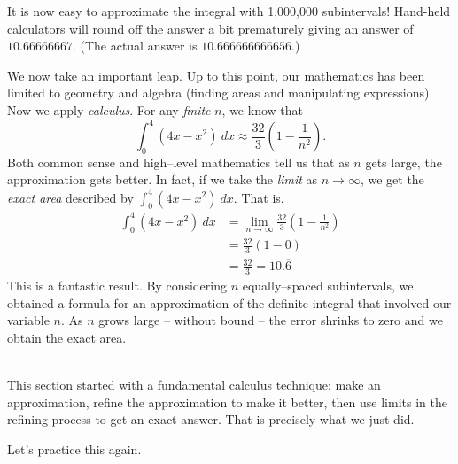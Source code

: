 {It is now easy to approximate the integral with 1,000,000 subintervals!  Hand-held calculators will round off the answer a bit prematurely giving an answer of $10.66666667$. (The actual answer is $10.666666666656$.)

We now take an important leap. Up to this point, our mathematics has been limited to geometry and algebra (finding areas and manipulating expressions). Now we apply \textit{calculus}. For any \textit{finite} $n$, we know that $$\int_0^4 (4x-x^2)\ dx \approx \frac{32}{3}\left(1-\frac{1}{n^2}\right).$$ Both common sense and high--level mathematics tell us that as $n$ gets large, the approximation gets better. In fact, if we take the \textit{limit} as $n\rightarrow \infty$, we get the \textit{exact area} described by $\int_0^4 (4x-x^2)\ dx$. That is, 
\begin{align*}
\int_0^4 (4x-x^2)\ dx &= \lim_{n\rightarrow \infty} \frac{32}{3}\left(1-\frac{1}{n^2}\right) \\
									&= \frac{32}{3}\left(1-0\right)\\
									&= \frac{32}{3} = 10.\overline{6}
\end{align*}
This is a fantastic result. By considering $n$ equally--spaced subintervals, we obtained a formula for an approximation of the definite integral that involved our variable $n$. As $n$ grows large -- without bound -- the error shrinks to zero and we obtain the exact area.
}\\

This section started with a fundamental calculus technique: make an approximation, refine the approximation to make it better, then use limits in the refining process to get an exact answer. That is precisely what we just did.

Let's practice this again.\\

